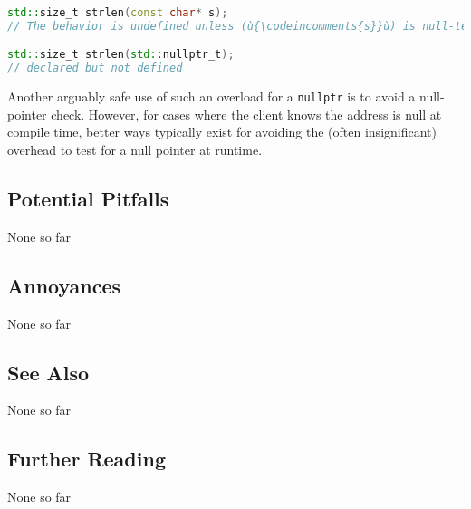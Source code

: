 \begin{lstlisting}[language=C++]
std::size_t strlen(const char* s);
// The behavior is undefined unless (ù{\codeincomments{s}}ù) is null-terminated.

std::size_t strlen(std::nullptr_t);
// declared but not defined
\end{lstlisting}


\noindent Another arguably safe use of such an overload for a \texttt{nullptr} is
to avoid a null-pointer check. However, for cases where the client knows the address is null at compile time, better ways typically exist for avoiding the (often
insignificant) overhead to test for a null pointer at runtime.

\subsection[Potential Pitfalls]{Potential Pitfalls}\label{potential-pitfalls}

None so far

\subsection[Annoyances]{Annoyances}\label{annoyances}

None so far

\subsection[See Also]{See Also}\label{see-also}

None so far

\subsection[Further Reading]{Further Reading}\label{further-reading}

None so far

